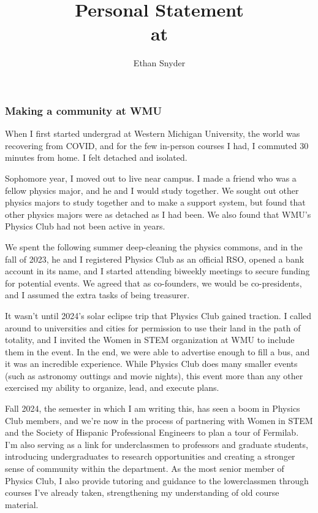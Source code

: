 \documentclass[11pt]{article}
\title{Personal Statement\\
	\large \dept{} at \school{}}
\author{Ethan Snyder}
\date{}
\begin{document}
\maketitle
\subsubsection*{Making a community at WMU}
When I first started undergrad at Western Michigan University, the world was recovering from COVID, and for the few in-person courses I had, I commuted 30 minutes from home. I felt detached and isolated.

Sophomore year, I moved out to live near campus. I made a friend who was a fellow physics major, and he and I would study together. We sought out other physics majors to study together and to make a support system, but found that other physics majors were as detached as I had been. We also found that WMU's Physics Club had not been active in years.

We spent the following summer deep-cleaning the physics commons, and in the fall of 2023, he and I registered Physics Club as an official RSO, opened a bank account in its name, and I started attending biweekly meetings to secure funding for potential events. We agreed that as co-founders, we would be co-presidents, and I assumed the extra tasks of being treasurer.

It wasn't until 2024's solar eclipse trip that Physics Club gained traction. I called around to universities and cities for permission to use their land in the path of totality, and I invited the Women in STEM organization at WMU to include them in the event. In the end, we were able to advertise enough to fill a bus, and it was an incredible experience. While Physics Club does many smaller events (such as astronomy outtings and movie nights), this event more than any other exercised my ability to organize, lead, and execute plans.

Fall 2024, the semester in which I am writing this, has seen a boom in Physics Club members, and we're now in the process of partnering with Women in STEM and the Society of Hispanic Professional Engineers to plan a tour of Fermilab. I'm also serving as a link for underclassmen to professors and graduate students, introducing undergraduates to research opportunities and creating a stronger sense of community within the department. As the most senior member of Physics Club, I also provide tutoring and guidance to the lowerclassmen through courses I've already taken, strengthening my understanding of old course material.
\end{document}
